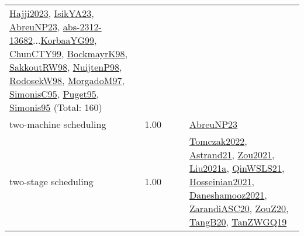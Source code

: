 {\begin{longtable}{p{3cm}r>{\raggedright\arraybackslash}p{6cm}>{\raggedright\arraybackslash}p{6cm}>{\raggedright\arraybackslash}p{8cm}}
\hyperref[detail:Hajji2023]{Hajji2023}, \hyperref[detail:IsikYA23]{IsikYA23}, \hyperref[detail:AbreuNP23]{AbreuNP23}, \hyperref[detail:abs-2312-13682]{abs-2312-13682}...\hyperref[detail:KorbaaYG99]{KorbaaYG99}, \hyperref[detail:ChunCTY99]{ChunCTY99}, \hyperref[detail:BockmayrK98]{BockmayrK98}, \hyperref[detail:SakkoutRW98]{SakkoutRW98}, \hyperref[detail:NuijtenP98]{NuijtenP98}, \hyperref[detail:RodosekW98]{RodosekW98}, \hyperref[detail:MorgadoM97]{MorgadoM97}, \hyperref[detail:SimonisC95]{SimonisC95}, \hyperref[detail:Puget95]{Puget95}, \hyperref[detail:Simonis95]{Simonis95} (Total: 160)\\
\index{two-machine scheduling}\index{Concepts!two-machine scheduling}two-machine scheduling &  1.00 &  &  & \hyperref[detail:AbreuNP23]{AbreuNP23}\\
\index{two-stage scheduling}\index{Concepts!two-stage scheduling}two-stage scheduling &  1.00 &  &  & \hyperref[detail:Tomczak2022]{Tomczak2022}, \hyperref[detail:Astrand21]{Astrand21}, \hyperref[detail:Zou2021]{Zou2021}, \hyperref[detail:Liu2021a]{Liu2021a}, \hyperref[detail:QinWSLS21]{QinWSLS21}, \hyperref[detail:Hosseinian2021]{Hosseinian2021}, \hyperref[detail:Daneshamooz2021]{Daneshamooz2021}, \hyperref[detail:ZarandiASC20]{ZarandiASC20}, \hyperref[detail:ZouZ20]{ZouZ20}, \hyperref[detail:TangB20]{TangB20}, \hyperref[detail:TanZWGQ19]{TanZWGQ19}\\

\end{longtable}}
